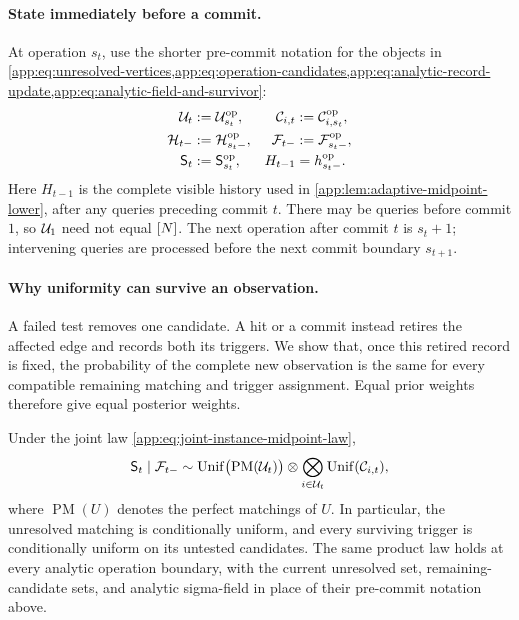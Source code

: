 \paragraph{State immediately before a commit.}
At operation \(s_t\), use the shorter pre-commit notation for the
objects in \cref{app:eq:unresolved-vertices,app:eq:operation-candidates,app:eq:analytic-record-update,app:eq:analytic-field-and-survivor}:
\begin{equation}
 \begin{aligned}
 \mathcal U_{t}&:=\mathcal U^{\mathrm{op}}_{s_t},&
 \mathcal C_{i,t}&:=\mathcal C^{\mathrm{op}}_{i,s_t},\\
 \mathcal H_{t-}&:=\mathcal H^{\mathrm{op}}_{s_t-},&
 \mathcal F_{t-}&:=\mathcal F^{\mathrm{op}}_{s_t-},\\
 \mathsf S_{t}&:=\mathsf S^{\mathrm{op}}_{s_t},&
 H_{t-1}&=h^{\mathrm{op}}_{s_t-}.
 \end{aligned}
 \label{app:eq:remaining-trigger-set}
\end{equation}
Here \(H_{t-1}\) is the complete visible history used in
\cref{app:lem:adaptive-midpoint-lower}, after any queries preceding commit
\(t\). There may be queries before commit \(1\), so
\(\mathcal U_{1}\) need not equal \([N]\).
The next operation after commit \(t\) is \(s_t+1\); intervening queries
are processed before the next commit boundary \(s_{t+1}\).

\paragraph{Why uniformity can survive an observation.}
A failed test removes one candidate. A hit or a commit instead retires
the affected edge and records both its triggers.
We show that, once this retired record is fixed, the probability of the
complete new observation is the same for every compatible remaining
matching and trigger assignment. Equal prior weights therefore give equal
posterior weights.

\begin{lemma}
\label{app:lem:unresolved-invariant}
Under the joint law \eqref{app:eq:joint-instance-midpoint-law},
\begin{equation}
 \mathsf S_{t}\mid\mathcal F_{t-}
 \sim
 \operatorname{Unif}\bigl(\operatorname{PM}
   (\mathcal U_{t})\bigr)
 \otimes
 \bigotimes_{i\in\mathcal U_{t}}
 \operatorname{Unif}(\mathcal C_{i,t}),
 \label{app:eq:strong-survivor-invariant}
\end{equation}
where \(\operatorname{PM}(U)\) denotes the perfect matchings of \(U\).
In particular, the unresolved matching is conditionally uniform, and every
surviving trigger is conditionally uniform on its untested candidates.
The same product law holds at every analytic operation boundary, with the
current unresolved set, remaining-candidate sets, and analytic sigma-field in
place of their pre-commit notation above.
\end{lemma}

